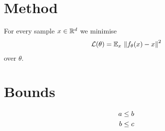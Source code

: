 \documentclass{article}
\begin{document}
\section{Method}
For every sample $x \in \mathbb{R}^d$ we minimise
\begin{equation}
  \mathcal{L}(\theta) = \mathbb{E}_{x}\, \left\lVert f_\theta(x) - x \right\rVert^2 \label{eq:loss}
\end{equation}
over $\theta$.

\section{Bounds}
\begin{align}
  a &\leq b \label{eq:first} \\
  b &\leq c \notag
\end{align}
\end{document}
